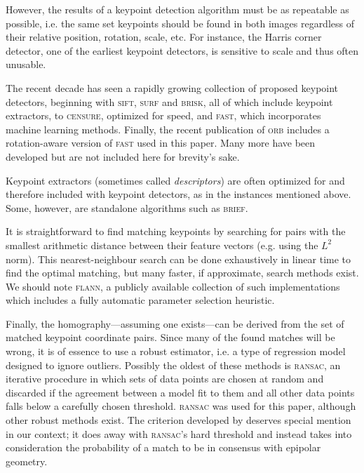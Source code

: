 \documentclass[floatfix,aip,rsi,reprint,graphicx]{revtex4-1}
\begin{document}
However, the results of a keypoint detection algorithm
must be as repeatable as possible, i.e. the same set keypoints should be found
in both images regardless of their relative position, rotation, scale, etc. 
For instance, the Harris corner detector\cite{Harris88}, one of the earliest
keypoint detectors, is sensitive to scale and thus often unusable.

The recent decade has seen a rapidly growing collection of proposed keypoint detectors,
beginning with \textsc{sift}\cite{Lowe04}, \textsc{surf}\cite{Bay08} and
\textsc{brisk}\cite{Leutenegger11}, all of which include keypoint extractors, to
\textsc{censure}\cite{Agrawal08}, optimized for speed, and
\textsc{fast}\cite{Rosten05}, which incorporates machine learning methods.
Finally, the recent publication of \textsc{orb}\cite{Rublee11} includes a
rotation-aware version of \textsc{fast} used in this paper. Many more have been
developed but are not included here for brevity's sake.

Keypoint extractors (sometimes called \emph{descriptors}) are often optimized
for and therefore included with keypoint detectors, as in the instances
mentioned above. Some, however, are standalone algorithms such as
\textsc{brief}\cite{Calonder10}.

It is straightforward to find matching keypoints by searching for pairs
with the smallest arithmetic distance between their feature vectors (e.g. using the $L^2$ norm). This nearest-neighbour search
can be done exhaustively in linear time to find the optimal matching, but many
faster, if approximate, search methods exist. We should note \textsc{flann}\cite{Muja09},
a publicly available collection of such implementations which includes a fully
automatic parameter selection heuristic.

Finally, the homography---assuming one exists---can be derived from the set of
matched keypoint coordinate pairs. Since many of the found matches will be
wrong, it is of essence to use a robust estimator, i.e. a type of regression
model designed to ignore outliers. Possibly the oldest of these methods is
\textsc{ransac}\cite{Fischler81}, an iterative procedure in which sets of data points are
chosen at random and discarded if the agreement between a model fit to them and
all other data points falls below a carefully chosen threshold. \textsc{ransac} was used
for this paper, although other robust methods exist. The criterion developed by
\citet{Moisan04} deserves special mention in our context; it does away with
\textsc{ransac}'s hard threshold and instead takes into consideration the probability of
a match to be in consensus with epipolar geometry.
\end{document}
